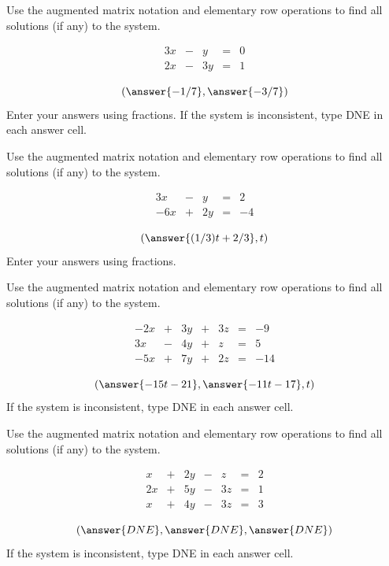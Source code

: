 \documentclass{ximera}
\begin{document}
\begin{exercise}
Use the augmented matrix notation and elementary row operations to find all solutions (if any) to the system. 
 
$$\begin{matrix}
      3x& -&y&=&0\\
      2x & -&3y&= &1
    \end{matrix}$$
 
 $$(\answer{-1/7}, \answer{-3/7})$$
Enter your answers using fractions.  If the system is inconsistent, type DNE in each answer cell.
\end{exercise}

\begin{exercise}
Use the augmented matrix notation and elementary row operations to find all solutions (if any) to the system. 
 
$$\begin{matrix}
      3x& -&y&=&2\\
      -6x & +&2y&= &-4
    \end{matrix}$$
 
 $$(\answer{(1/3)t+2/3}, t)$$
Enter your answers using fractions. 
\end{exercise}

\begin{exercise}
Use the augmented matrix notation and elementary row operations to find all solutions (if any) to the system. 
 
$$\begin{matrix}
      -2x& +&3y&+&3z&=&-9\\
      3x & -&4y&+&z&= &5\\
      -5x&+&7y&+&2z&=&-14
    \end{matrix}$$
 
 $$(\answer{-15t-21}, \answer{-11t-17}, t)$$
If the system is inconsistent, type DNE in each answer cell.
\end{exercise}

\begin{exercise}
Use the augmented matrix notation and elementary row operations to find all solutions (if any) to the system. 
 
$$\begin{matrix}
      x& +&2y&-&z&=&2\\
      2x & +&5y&-&3z&= &1\\
      x&+&4y&-&3z&=&3
    \end{matrix}$$
 
 $$(\answer{DNE}, \answer{DNE}, \answer{DNE})$$
If the system is inconsistent, type DNE in each answer cell.
\end{exercise}
\end{document}
